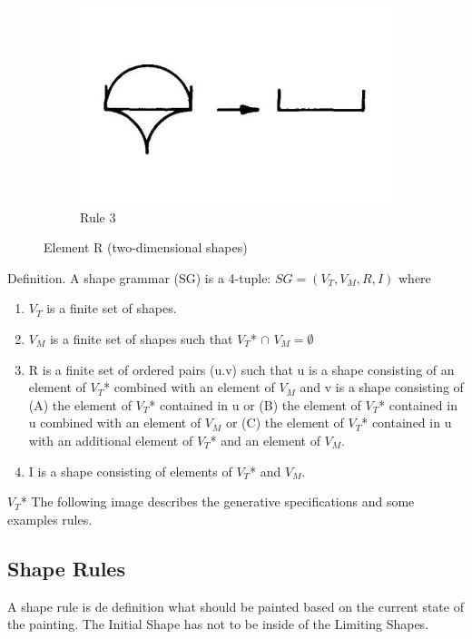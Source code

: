\documentclass[11pt, a4paper]{report}
\begin{document}
\begin{figure}[!h]
    \begin{subfigure}[b]{0.3\textwidth}
        \includegraphics[width=\textwidth]{sg_specification_rule3.jpg}
        \caption{Rule 3}
        \label{fig:Shape Grammars/Shape Specification/Rule 3}
    \end{subfigure}
    \caption{ Element R (two-dimensional shapes) \citep{shapeGrammars:1972}}\label{fig:Shape Grammars/Shape Specification/two-dimensional  shapes}
\end{figure}


\begin{displayquote}
    Definition. A shape grammar (SG) is a 4-tuple: $SG = (V_T, V_M, R, I)$ where
    \begin{enumerate}
        \item $V_T$ is a finite set of shapes.
        \item $V_M$ is a finite set of shapes such that $V_T $* $\cap$  $V_M = \emptyset$
        \item R is a finite set of ordered pairs (u.v) such that u is a shape consisting of an element of $V_T $* combined with an element of $V_M$ and v is a shape consisting of (A) the element of $V_T $* contained in u or (B) the element of $V_T $* contained in u combined with an element of $V_M$ or (C) the element of $V_T $* contained in u with an additional element of $V_T$* and an element of $V_M$.
        \item I is a shape consisting of elements of $V_T $* and $V_M$.
    \end{enumerate}
\end{displayquote}
$V_T $* 
The following image describes the generative specifications and some examples rules.
\pagebreak


\subsection{Shape Rules}
A shape rule is de definition what should be painted based on the current state of the painting. The Initial Shape has not to be inside of the Limiting Shapes.
\end{document}
